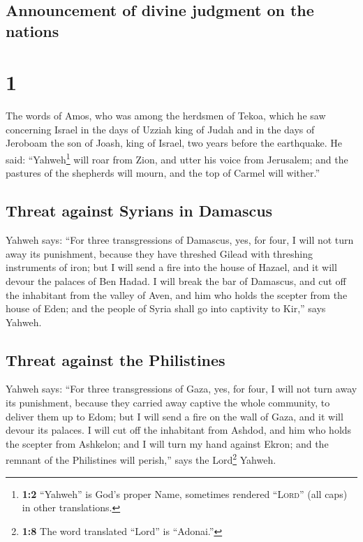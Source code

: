 \hypertarget{announcement-of-divine-judgment-on-the-nations}{%
\subsection{Announcement of divine judgment on the
nations}\label{announcement-of-divine-judgment-on-the-nations}}

\hypertarget{section}{%
\section{1}\label{section}}

 The words of Amos, who was among the herdsmen of Tekoa,
which he saw concerning Israel in the days of Uzziah king of Judah and
in the days of Jeroboam the son of Joash, king of Israel, two years
before the earthquake.  He said: ``Yahweh\footnote{\textbf{1:2}
  ``Yahweh'' is God's proper Name, sometimes rendered ``\textsc{Lord}''
  (all caps) in other translations.} will roar from Zion, and utter his
voice from Jerusalem; and the pastures of the shepherds will mourn, and
the top of Carmel will wither.''

\hypertarget{threat-against-syrians-in-damascus}{%
\subsection{Threat against Syrians in
Damascus}\label{threat-against-syrians-in-damascus}}

 Yahweh says: ``For three transgressions of Damascus, yes,
for four, I will not turn away its punishment, because they have
threshed Gilead with threshing instruments of iron;  but I
will send a fire into the house of Hazael, and it will devour the
palaces of Ben Hadad.  I will break the bar of Damascus,
and cut off the inhabitant from the valley of Aven, and him who holds
the scepter from the house of Eden; and the people of Syria shall go
into captivity to Kir,'' says Yahweh.

\hypertarget{threat-against-the-philistines}{%
\subsection{Threat against the
Philistines}\label{threat-against-the-philistines}}

 Yahweh says: ``For three transgressions of Gaza, yes, for
four, I will not turn away its punishment, because they carried away
captive the whole community, to deliver them up to Edom; 
but I will send a fire on the wall of Gaza, and it will devour its
palaces.  I will cut off the inhabitant from Ashdod, and
him who holds the scepter from Ashkelon; and I will turn my hand against
Ekron; and the remnant of the Philistines will perish,'' says the
Lord\footnote{\textbf{1:8} The word translated ``Lord'' is ``Adonai.''}
Yahweh.

